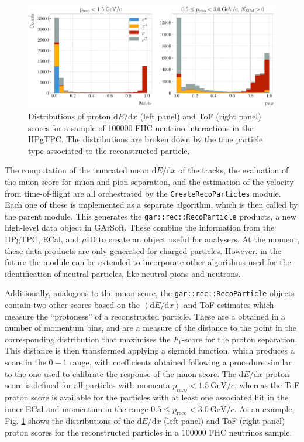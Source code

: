 \begin{figure}[t]
    \centering
    \includegraphics[width=.99\linewidth]{Images/GArSoft_PID/caf_proton_scores.pdf}
    \caption[Distributions of proton $\mathrm{d}E/\mathrm{d}x$ and ToF scores for a sample of 100000 FHC neutrino interactions in the HPgTPC.]{Distributions of proton $\mathrm{d}E/\mathrm{d}x$ (left panel) and ToF (right panel) scores for a sample of 100000 FHC neutrino interactions in the HPgTPC. The distributions are broken down by the true particle type associated to the reconstructed particle.}
    \label{fig:proton_scores}
\end{figure}

The computation of the truncated mean $\mathrm{d}E/\mathrm{d}x$ of the tracks, the evaluation of the muon score for muon and pion separation, and the estimation of the velocity from time-of-flight are all orchestrated by the \texttt{CreateRecoParticles} module. Each one of these is implemented as a separate algorithm, which is then called by the parent module. This generates the \texttt{gar::rec::RecoParticle} products, a new high-level data object in GArSoft. These combine the information from the HPgTPC, ECal, and $\mu$ID to create an object useful for analysers. At the moment, these data products are only generated for charged particles. However, in the future the module can be extended to incorporate other algorithms used for the identification of neutral particles, like neutral pions and neutrons.

Additionally, analogous to the muon score, the \texttt{gar::rec::RecoParticle} objects contain two other scores based on the $\left<\mathrm{d}E/\mathrm{d}x\right>$ and ToF estimates which measure the ``protoness'' of a reconstructed particle. These are a obtained in a number of momentum bins, and are a measure of the distance to the point in the corresponding distribution that maximises the $F_{1}$-score for the proton separation. This distance is then transformed applying a sigmoid function, which produces a score in the $0-1$ range, with coefficients obtained following a procedure similar to the one used to calibrate the response of the muon score. The $\mathrm{d}E/\mathrm{d}x$ proton score is defined for all particles with momenta $p_{\mathrm{reco}} < 1.5~\mathrm{GeV}/c$, whereas the ToF proton score is available for the particles with at least one associated hit in the inner ECal and momentum in the range $0.5 \leq p_{\mathrm{reco}} < 3.0~\mathrm{GeV}/c$. As an example, Fig. \ref{fig:proton_scores} shows the distributions of the $\mathrm{d}E/\mathrm{d}x$ (left panel) and ToF (right panel) proton scores for the reconstructed particles in a 100000 FHC neutrinos sample.

